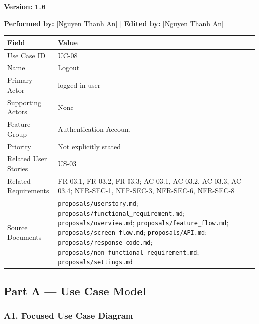 \documentclass[12pt]{article}
\renewcommand{\baselinestretch}{1.5}
\begin{document}
\textbf{Version:} \texttt{1.0}
\par\medskip

\textbf{Performed by:} [Nguyen Thanh An] | \textbf{Edited by:} [Nguyen Thanh An]
\par\medskip

\begingroup
\small
\renewcommand{\baselinestretch}{1.0}\selectfont
\renewcommand{\arraystretch}{1.15}
\setlength{\tabcolsep}{6pt}
\begin{longtable}{|>{\raggedright\arraybackslash}p{}|>{\raggedright\arraybackslash}p{}|}
\hline
\textbf{Field} & \textbf{Value} \\ \hline
\endhead
Use Case ID & UC-08 \\ \hline
Name & Logout \\ \hline
Primary Actor & logged-in user \\ \hline
Supporting Actors & None \\ \hline
Feature Group & Authentication Account \\ \hline
Priority & Not explicitly stated \\ \hline
Related User Stories & US-03 \\ \hline
Related Requirements & FR-03.1, FR-03.2, FR-03.3; AC-03.1, AC-03.2, AC-03.3, AC-03.4; NFR-SEC-1, NFR-SEC-3, NFR-SEC-6, NFR-SEC-8 \\ \hline
Source Documents & \texttt{proposals/userstory.md}; \texttt{proposals/functional\_requirement.md}; \texttt{proposals/overview.md}; \texttt{proposals/feature\_flow.md}; \texttt{proposals/screen\_flow.md}; \texttt{proposals/API.md}; \texttt{proposals/response\_code.md}; \texttt{proposals/non\_functional\_requirement.md}; \texttt{proposals/settings.md} \\ \hline
\end{longtable}
\endgroup
\par\medskip

\hypertarget{sec:part-a-use-case-model}{}
\subsection*{Part A --- Use Case Model}
\par\medskip

\hypertarget{sec:a1-focused-use-case-diagram}{}
\subsubsection*{A1. Focused Use Case Diagram}
\par\medskip
\end{document}
